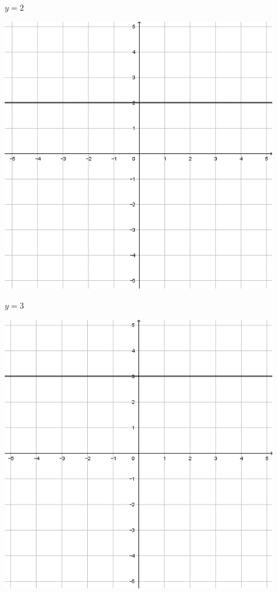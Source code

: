 \documentclass[a4paper]{oblivoir}
\begin{document}
\begin{minipage}{0.45\textwidth}\centering
\(y=2\)
\par\bigskip\includegraphics[width=0.9\textwidth]{img/5-3}
\end{minipage}
\begin{minipage}{0.45\textwidth}\centering
\(y=3\)
\par\bigskip\includegraphics[width=0.9\textwidth]{img/5-4}
\end{minipage}\bigskip\bigskip\par
\end{document}

